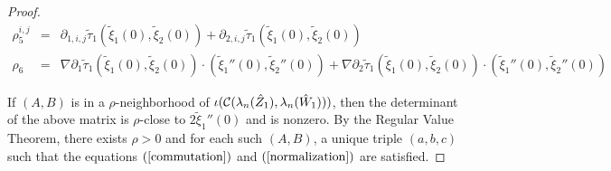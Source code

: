 \begin{proof}
\begin{eqnarray}
\nonumber \rho_5^{i,j}&=&\partial_{1,i,j}\tilde \tau_1(\tilde \xi_1(0),\tilde \xi_2(0))+\partial_{2,i,j}\tilde \tau_1(\tilde \xi_1(0),\tilde \xi_2(0))\\
\nonumber \rho_6&=&\nabla \partial_1 \tilde \tau_1(\tilde \xi_1(0),\tilde \xi_2(0)) \cdot (\tilde \xi_1''(0), \tilde \xi_2''(0))+\nabla \partial_2 \tilde \tau_1(\tilde \xi_1(0),\tilde \xi_2(0)) \cdot (\tilde \xi_1''(0), \tilde \xi_2''(0))
\end{eqnarray}

If $(A,B)$ is in a $\rho$-neighborhood of  $\iota(\mathcal{C}(\lambda_n(\hat Z_1),\lambda_n(\hat W_1)))$, then the determinant of the above matrix is $\rho$-close to $2 \tilde \xi_1''(0)$ and is nonzero. By the Regular Value Theorem, there exists $\rho>0$ and for each such $(A,B)$, a unique triple $(a,b,c)$ such that  the  equations $(\ref{commutation})$ and $(\ref{normalization})$ are satisfied.
\end{proof}


